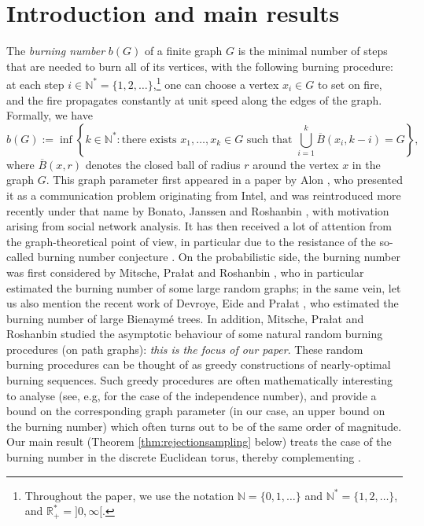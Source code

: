 \documentclass[a4paper,11pt]{article}
\begin{document}
\section*{Introduction and main results}
The \emph{burning number} $b(G)$ of a finite graph $G$ is the minimal number of steps that are needed to burn all of its vertices, with the following burning procedure: at each step $i\in\mathbb{N}^*=\{1,2,\ldots\}$,\footnote{Throughout the paper, we use the notation $\mathbb{N}=\{0,1,\ldots\}$ and $\mathbb{N}^*=\{1,2,\ldots\}$, and $\mathbb{R}_+^*={]0,\infty[}$.} one can choose a vertex $x_i\in G$ to set on fire, and the fire propagates constantly at unit speed along the edges of the graph.
Formally, we have
\[b(G):=\inf\left\{k\in\mathbb{N}^*:\text{there exists $x_1,\ldots,x_k\in G$ such that $\bigcup_{i=1}^k\overline{B}(x_i,k-i)=G$}\right\},\]
where $ \overline{B}(x,r)$ denotes the closed ball of radius $r$ around the vertex $x$ in the graph $G$.
This graph parameter first appeared in a paper by Alon \cite{alon}, who presented it as a communication problem originating from Intel, and was reintroduced more recently under that name by Bonato, Janssen and Roshanbin \cite{bonatojanssenroshanbin}, with motivation arising from social network analysis.
It has then received a lot of attention from the graph-theoretical point of view, in particular due to the resistance of the so-called burning number conjecture \cite{bessybonatojanssenrautenbachroshanbin,landlu,bastidebonamybonatocharbitkamalipierronrabie,norinturcotte}.
On the probabilistic side, the burning number was first considered by Mitsche, Pra\l{}at and Roshanbin \cite{mitschepralatroshanbin}, who in particular estimated the burning number of some large random graphs; in the same vein, let us also mention the recent work of Devroye, Eide and Pra\l{}at \cite{devroyeeidepralat}, who estimated the burning number of large Bienaymé trees.
In addition, Mitsche, Pra\l{}at and Roshanbin \cite{mitschepralatroshanbin} studied the asymptotic behaviour of some natural random burning procedures (on path graphs): \emph{this is the focus of our paper}.
These random burning procedures can be thought of as greedy constructions of nearly-optimal burning sequences.
Such greedy procedures are often mathematically interesting to analyse (see, e.g, \cite{greedylocal} for the case of the independence number), and provide a bound on the corresponding graph parameter (in our case, an upper bound on the burning number) which often turns out to be of the same order of magnitude.
Our main result (Theorem \ref{thm:rejectionsampling} below) treats the case of the burning number in the discrete Euclidean torus, thereby complementing \cite[Theorem 1.4.(ii)]{mitschepralatroshanbin}.
\end{document}
